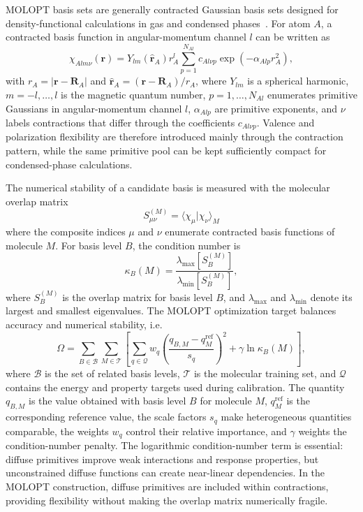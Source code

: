 \documentclass[aps,prb,reprint,amsmath,amssymb,superscriptaddress,longbibliography,floatfix]{revtex4-2}
\begin{document}
MOLOPT basis sets are generally contracted Gaussian basis sets designed for density-functional calculations in gas and condensed phases~\cite{VandeVondele2007}. For atom $A$, a contracted basis function in angular-momentum channel $l$ can be written as
\begin{equation}
\chi_{A l m \nu}(\mathbf r)
=
Y_{lm}(\hat{\mathbf r}_A) r_A^{l}
\sum_{p=1}^{N_{Al}} c_{A l\nu p}
\exp\left(-\alpha_{A l p} r_A^2\right),
\label{eq:contracted_basis}
\end{equation}
with $r_A=|\mathbf r-\mathbf R_A|$ and $\hat{\mathbf r}_A=(\mathbf r-\mathbf R_A)/r_A$, where $Y_{lm}$ is a spherical harmonic, $m=-l,\ldots,l$ is the magnetic quantum number, $p=1,\ldots,N_{Al}$ enumerates primitive Gaussians in angular-momentum channel $l$, $\alpha_{A l p}$ are primitive exponents, and $\nu$ labels contractions that differ through the coefficients $c_{A l\nu p}$. Valence and polarization flexibility are therefore introduced mainly through the contraction pattern, while the same primitive pool can be kept sufficiently compact for condensed-phase calculations.

The numerical stability of a candidate basis is measured with the molecular overlap matrix
\begin{equation}
S_{\mu\nu}^{(M)} =\langle \chi_\mu|\chi_\nu\rangle_M 
\label{eq:overlap}
\end{equation}
where the composite indices $\mu$ and $\nu$ enumerate contracted basis functions of molecule $M$. For basis level $B$, the condition number is
\begin{equation}
\kappa_B(M)=
\frac{\lambda_{\max}\!\left[S_B^{(M)}\right]}
{\lambda_{\min}\!\left[S_B^{(M)}\right]} ,
\label{eq:condition}
\end{equation}
where $S_B^{(M)}$ is the overlap matrix for basis level $B$, and $\lambda_{\max}$ and $\lambda_{\min}$ denote its largest and smallest eigenvalues. The MOLOPT optimization target balances accuracy and numerical stability, i.e.
\begin{equation}
\Omega =
\sum_{B\in\mathcal B}\sum_{M\in\mathcal T}
\left[
\sum_{q\in\mathcal Q} w_q
\left(
\frac{q_{B,M}-q_M^{\mathrm{ref}}}{s_q}
\right)^2
+ \gamma\ln\kappa_B(M)
\right],
\label{eq:molopt}
\end{equation}
where $\mathcal B$ is the set of related basis levels, $\mathcal T$ is the molecular training set, and $\mathcal Q$ contains the energy and property targets used during calibration. The quantity $q_{B,M}$ is the value obtained with basis level $B$ for molecule $M$, $q_M^{\mathrm{ref}}$ is the corresponding reference value, the scale factors $s_q$ make heterogeneous quantities comparable, the weights $w_q$ control their relative importance, and $\gamma$ weights the condition-number penalty. The logarithmic condition-number term is essential: diffuse primitives improve weak interactions and response properties, but unconstrained diffuse functions can create near-linear dependencies. In the MOLOPT construction, diffuse primitives are included within contractions, providing flexibility without making the overlap matrix numerically fragile.
\end{document}
